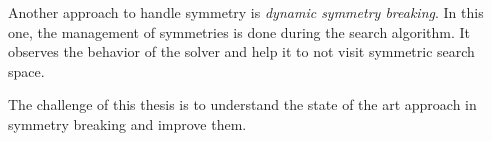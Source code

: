 Another approach to handle symmetry is \emph{dynamic symmetry breaking}. In this one, the management of
symmetries is done during the search algorithm. It observes the behavior of the solver and help it to
not visit symmetric search space.


The challenge of this thesis is to understand the state of  the art approach in symmetry breaking and
improve them.

%
%
%
%
%
%




